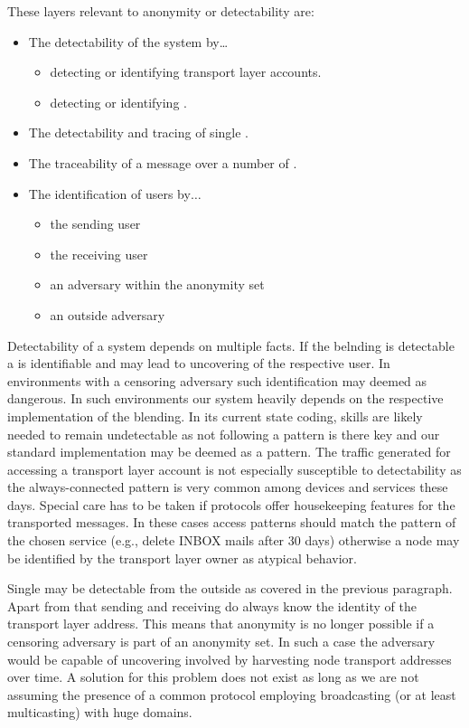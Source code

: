 These layers relevant to anonymity or detectability are:
\begin{itemize}
	\item The detectability of the system by\ldots
	\begin{itemize}
		\item detecting or identifying transport layer accounts.
		\item detecting or identifying \VortexNodes{}.
	\end{itemize}
	\item The detectability and tracing of single \VortexMessages.
	\item The traceability of a message over a number of \VortexNodes{}.
	\item The identification of \MessageVortex{} users by$\ldots$
	\begin{itemize}
		\item the sending \MessageVortex{} user
		\item the receiving \MessageVortex{} user
		\item an adversary within the anonymity set
		\item an outside adversary
	\end{itemize}
\end{itemize} 

Detectability of a system depends on multiple facts. If the belnding is detectable a \VortexNode{} is identifiable and may lead to uncovering of the respective user. In environments with a censoring adversary such identification may deemed as dangerous. In such environments our system heavily depends on the respective implementation of the blending. In its current state coding, skills are likely needed to remain undetectable as not following a pattern is there key and our standard implementation may be deemed as a pattern. The traffic generated for accessing a transport layer account is not especially susceptible to detectability as the always-connected pattern is very common among devices and services these days. Special care has to be taken if protocols offer housekeeping features for the transported messages. In these cases access patterns should match the pattern of the chosen service (e.g., delete INBOX mails after 30 days) otherwise a node may be identified by the transport layer owner as atypical behavior.

Single \VortexMessages{} may be detectable from the outside as covered in the previous paragraph. Apart from that sending and receiving \VortexNodes{} do always know the identity of the transport layer address. This means that anonymity is no longer possible if a censoring adversary is part of an anonymity set. In such a case the adversary would be capable of uncovering involved \VortexNodes{} by harvesting node transport addresses over time. A solution for this problem does not exist as long as we are not assuming the presence of a common protocol employing broadcasting (or at least multicasting) with huge domains.

